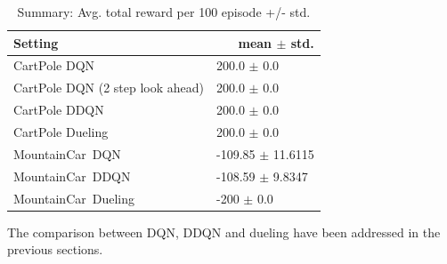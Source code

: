 \documentclass[12pt]{article}
\begin{document}
    \begin{tcolorbox}[fit,height=22cm, width=\textwidth, blank, borderline={1pt}{-2pt},nobeforeafter]
        \begin{table}[H]
    	\centering
    	\caption{ Summary: Avg. total reward per 100 episode +/- std.}
    	\begin{tabular}{|p{9.43em}|r|}
    		\hline
    		\textbf{\small Setting} & \multicolumn{1}{p{10.645em}|}{\textbf{ \small mean $\pm$ std.}} \\
    		\hline
    		{\small CartPole DQN} & \multicolumn{1}{l|}{200.0 $\pm$ 0.0} \\
    		\hline
    		{\small CartPole DQN} \newline{} {\small(2 step look ahead)} & \multicolumn{1}{l|}{200.0 $\pm$ 0.0} \\
    		\hline
    		{\small CartPole DDQN} & \multicolumn{1}{l|}{200.0 $\pm$ 0.0} \\
    		\hline
    		{\small CartPole Dueling} & \multicolumn{1}{l|}{200.0 $\pm$ 0.0} \\
    		\hline
    		{\small MountainCar DQN} & \multicolumn{1}{l|}{-109.85 $\pm$ 11.6115} \\
    		\hline
    		{\small MountainCar DDQN} & \multicolumn{1}{l|}{-108.59 $\pm$ 9.8347} \\
    		\hline
    		{\small MountainCar Dueling} & \multicolumn{1}{l|}{-200 $\pm$ 0.0} \\
    		\hline
    	\end{tabular}%
    	\label{tab5}%
    \end{table}%
	The comparison between DQN, DDQN and dueling have been addressed in the previous sections.
    \end{tcolorbox}
\end{document}
